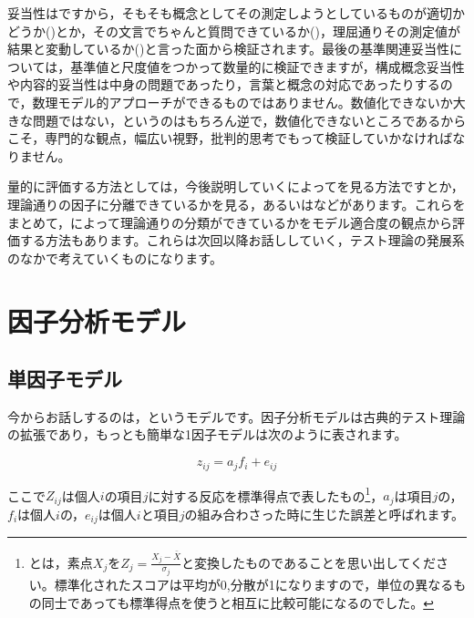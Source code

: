 \documentclass{ltjsbook}
\begin{document}
妥当性はですから，そもそも概念としてその測定しようとしているものが適切かどうか()とか，その文言でちゃんと質問できているか()，理屈通りその測定値が結果と変動しているか()と言った面から検証されます。最後の基準関連妥当性については，基準値と尺度値をつかって数量的に検証できますが，構成概念妥当性や内容的妥当性は中身の問題であったり，言葉と概念の対応であったりするので，数理モデル的アプローチができるものではありません。数値化できないか大きな問題ではない，というのはもちろん逆で，数値化できないところであるからこそ，専門的な観点，幅広い視野，批判的思考でもって検証していかなければなりません。

量的に評価する方法としては，今後説明していくによってを見る方法ですとか，理論通りの因子に分離できているかを見る，あるいはなどがあります。これらをまとめて，によって理論通りの分類ができているかをモデル適合度の観点から評価する方法もあります。これらは次回以降お話ししていく，テスト理論の発展系のなかで考えていくものになります。

\section{因子分析モデル}
\subsection{単因子モデル}
今からお話しするのは，というモデルです。因子分析モデルは古典的テスト理論の拡張であり，もっとも簡単な1因子モデルは次のように表されます。

\[ z_{ij} = a_j f_i + e_{ij} \]

ここで$Z_{ij}$は個人$i$の項目$j$に対する反応を標準得点で表したもの\footnote{とは，素点$X_j$を$Z_j = \frac{X_j - \bar{X}}{\sigma_j}$と変換したものであることを思い出してください。標準化されたスコアは平均が0,分散が1になりますので，単位の異なるもの同士であっても標準得点を使うと相互に比較可能になるのでした。}，$a_j$は項目$j$の，$f_i$は個人$i$の，$e_{ij}$は個人$i$と項目$j$の組み合わさった時に生じた誤差と呼ばれます。
\end{document}
